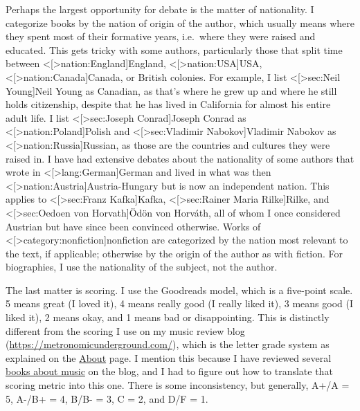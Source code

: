 \documentclass[12pt]{article}
\def\hyperref#1{<#1>} %
\begin{document}
Perhaps the largest opportunity for debate is the matter of nationality. I categorize books by the nation of origin of the author, which usually means where they spent most of their formative years, i.e.\ where they were raised and educated. This gets tricky with some authors, particularly those that split time between \hyperref[nation:England]{England}, \hyperref[nation:USA]{USA}, \hyperref[nation:Canada]{Canada}, or British colonies. For example, I list \hyperref[sec:Neil Young]{Neil Young} as Canadian, as that's where he grew up and where he still holds citizenship, despite that he has lived in California for almost his entire adult life. I list \hyperref[sec:Joseph Conrad]{Joseph Conrad} as \hyperref[nation:Poland]{Polish} and \hyperref[sec:Vladimir Nabokov]{Vladimir Nabokov} as \hyperref[nation:Russia]{Russian}, as those are the countries and cultures they were raised in. I have had extensive debates about the nationality of some authors that wrote in \hyperref[lang:German]{German} and lived in what was then \hyperref[nation:Austria]{Austria-Hungary} but is now an independent nation. This applies to \hyperref[sec:Franz Kafka]{Kafka}, \hyperref[sec:Rainer Maria Rilke]{Rilke}, and \hyperref[sec:Oedoen von Horvath]{Ödön von Horváth}, all of whom I once considered Austrian but have since been convinced otherwise. Works of \hyperref[category:nonfiction]{nonfiction} are categorized by the nation most relevant to the text, if applicable; otherwise by the origin of the author as with fiction. For biographies, I use the nationality of the subject, not the author.

The last matter is scoring. I use the Goodreads model, which is a five-point scale. 5 means great (I loved it), 4 means really good (I really liked it), 3 means good (I liked it), 2 means okay, and 1 means bad or disappointing. This is distinctly different from the scoring I use on my music review blog (\url{https://metronomicunderground.com/}), which is the letter grade system as explained on the \href{https://metronomicunderground.com/p/about.html}{About} page. I mention this because I have reviewed several \href{https://metronomicunderground.com/search/label/book%20review}{books about music} on the blog, and I had to figure out how to translate that scoring metric into this one. There is some inconsistency, but generally, A+/A = 5, A-/B+ = 4, B/B- = 3, C = 2, and D/F = 1.


\tableofcontents \label{sec:toc}
\end{document}
